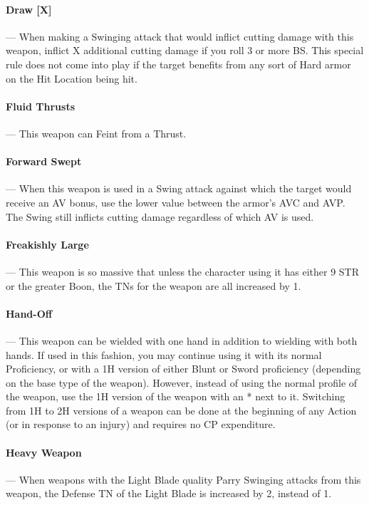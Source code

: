 \documentclass[oneside,11pt,english]{book}
\begin{document}
\paragraph{\label{wepqual:Draw}Draw [X]}---\quad
When making a Swinging attack that would inflict cutting damage with this weapon, inflict X additional cutting damage if you roll 3 or more BS. This special rule does not come into play if the target benefits from any sort of Hard armor on the Hit Location being hit.

\paragraph{\label{wepqual:Fluid Thrusts}Fluid Thrusts}---\quad
This weapon can Feint from a Thrust.

\paragraph{\label{wepqual:Forward Swept}Forward Swept}---\quad
When this weapon is used in a Swing attack against which the target would receive an AV bonus, use the lower value between the armor’s AVC and AVP. The Swing still inflicts cutting damage regardless of which AV is used.

\paragraph{\label{wepqual:Freakishly Large}Freakishly Large}---\quad
This weapon is so massive that unless the character using it has either 9 STR or the greater  Boon, the TNs for the weapon are all increased by 1.

\paragraph{\label{wepqual:Hand-Off}Hand-Off}---\quad
This weapon can be wielded with one hand in addition to wielding with both hands. If used in this fashion, you may continue using it with its normal Proficiency, or with a 1H version of either Blunt or Sword proficiency (depending on the base type of the weapon). However, instead of using the normal profile of the weapon, use the 1H version of the weapon with an * next to it. Switching from 1H to 2H versions of a weapon can be done at the beginning of any Action (or in response to an injury) and requires no CP expenditure.

\paragraph{\label{wepqual:Heavy Weapon}Heavy Weapon}---\quad
When weapons with the Light Blade quality Parry Swinging attacks from this weapon, the Defense TN of the Light Blade is increased by 2, instead of 1.
\end{document}

